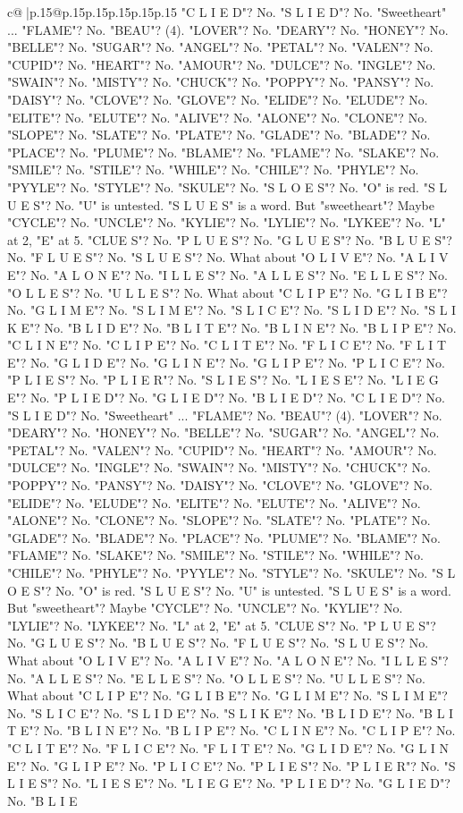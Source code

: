 \documentclass{article}
\begin{document}
{\begin{supertabular}{c@{$\;$}|p{.15\linewidth}@{}p{.15\linewidth}p{.15\linewidth}p{.15\linewidth}p{.15\linewidth}p{.15\linewidth}}
{{{"C L I E D"? No. "S L I E D"? No. "Sweetheart" ... "FLAME"? No. "BEAU"? (4). "LOVER"? No. "DEARY"? No. "HONEY"? No. "BELLE"? No. "SUGAR"? No. "ANGEL"? No. "PETAL"? No. "VALEN"? No. "CUPID"? No. "HEART"? No. "AMOUR"? No. "DULCE"? No. "INGLE"? No. "SWAIN"? No. "MISTY"? No. "CHUCK"? No. "POPPY"? No. "PANSY"? No. "DAISY"? No. "CLOVE"? No. "GLOVE"? No. "ELIDE"? No. "ELUDE"? No. "ELITE"? No. "ELUTE"? No. "ALIVE"? No. "ALONE"? No. "CLONE"? No. "SLOPE"? No. "SLATE"? No. "PLATE"? No. "GLADE"? No. "BLADE"? No. "PLACE"? No. "PLUME"? No. "BLAME"? No. "FLAME"? No. "SLAKE"? No. "SMILE"? No. "STILE"? No. "WHILE"? No. "CHILE"? No. "PHYLE"? No. "PYYLE"? No. "STYLE"? No. "SKULE"? No. "S L O E S"? No. "O" is red. "S L U E S"? No. "U" is untested. "S L U E S" is a word. But "sweetheart"? Maybe "CYCLE"? No. "UNCLE"? No. "KYLIE"? No. "LYLIE"? No. "LYKEE"? No. "L" at 2, "E" at 5. "CLUE S"? No. "P L U E S"? No. "G L U E S"? No. "B L U E S"? No. "F L U E S"? No. "S L U E S"? No. What about "O L I V E"? No. "A L I V E"? No. "A L O N E"? No. "I L L E S"? No. "A L L E S"? No. "E L L E S"? No. "O L L E S"? No. "U L L E S"? No. What about "C L I P E"? No. "G L I B E"? No. "G L I M E"? No. "S L I M E"? No. "S L I C E"? No. "S L I D E"? No. "S L I K E"? No. "B L I D E"? No. "B L I T E"? No. "B L I N E"? No. "B L I P E"? No. "C L I N E"? No. "C L I P E"? No. "C L I T E"? No. "F L I C E"? No. "F L I T E"? No. "G L I D E"? No. "G L I N E"? No. "G L I P E"? No. "P L I C E"? No. "P L I E S"? No. "P L I E R"? No. "S L I E S"? No. "L I E S E"? No. "L I E G E"? No. "P L I E D"? No. "G L I E D"? No. "B L I E D"? No. "C L I E D"? No. "S L I E D"? No. "Sweetheart" ... "FLAME"? No. "BEAU"? (4). "LOVER"? No. "DEARY"? No. "HONEY"? No. "BELLE"? No. "SUGAR"? No. "ANGEL"? No. "PETAL"? No. "VALEN"? No. "CUPID"? No. "HEART"? No. "AMOUR"? No. "DULCE"? No. "INGLE"? No. "SWAIN"? No. "MISTY"? No. "CHUCK"? No. "POPPY"? No. "PANSY"? No. "DAISY"? No. "CLOVE"? No. "GLOVE"? No. "ELIDE"? No. "ELUDE"? No. "ELITE"? No. "ELUTE"? No. "ALIVE"? No. "ALONE"? No. "CLONE"? No. "SLOPE"? No. "SLATE"? No. "PLATE"? No. "GLADE"? No. "BLADE"? No. "PLACE"? No. "PLUME"? No. "BLAME"? No. "FLAME"? No. "SLAKE"? No. "SMILE"? No. "STILE"? No. "WHILE"? No. "CHILE"? No. "PHYLE"? No. "PYYLE"? No. "STYLE"? No. "SKULE"? No. "S L O E S"? No. "O" is red. "S L U E S"? No. "U" is untested. "S L U E S" is a word. But "sweetheart"? Maybe "CYCLE"? No. "UNCLE"? No. "KYLIE"? No. "LYLIE"? No. "LYKEE"? No. "L" at 2, "E" at 5. "CLUE S"? No. "P L U E S"? No. "G L U E S"? No. "B L U E S"? No. "F L U E S"? No. "S L U E S"? No. What about "O L I V E"? No. "A L I V E"? No. "A L O N E"? No. "I L L E S"? No. "A L L E S"? No. "E L L E S"? No. "O L L E S"? No. "U L L E S"? No. What about "C L I P E"? No. "G L I B E"? No. "G L I M E"? No. "S L I M E"? No. "S L I C E"? No. "S L I D E"? No. "S L I K E"? No. "B L I D E"? No. "B L I T E"? No. "B L I N E"? No. "B L I P E"? No. "C L I N E"? No. "C L I P E"? No. "C L I T E"? No. "F L I C E"? No. "F L I T E"? No. "G L I D E"? No. "G L I N E"? No. "G L I P E"? No. "P L I C E"? No. "P L I E S"? No. "P L I E R"? No. "S L I E S"? No. "L I E S E"? No. "L I E G E"? No. "P L I E D"? No. "G L I E D"? No. "B L I E }}}
\end{supertabular}}
\end{document}

